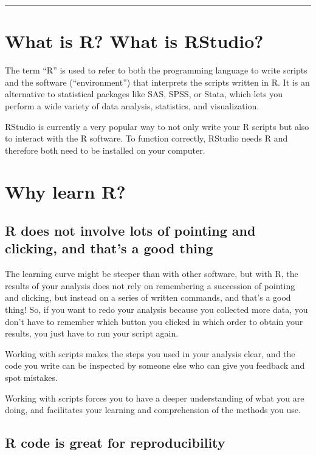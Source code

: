\documentclass[
]{book}
\begin{document}
\begin{center}\rule{0.5\linewidth}{0.5pt}\end{center}

\section{What is R? What is RStudio?}\label{what-is-r-what-is-rstudio}

The term ``R'' is used to refer to both the programming language to write scripts and the software (``environment'') that interprets the scripts written in R. It is an alternative to statistical packages like SAS, SPSS, or Stata, which lets you perform a wide variety of data analysis, statistics, and visualization.

RStudio is currently a very popular way to not only write your R scripts but
also to interact with the R software. To function correctly, RStudio needs R and therefore both need to be installed on your computer.

\section{Why learn R?}\label{why-learn-r}

\subsection{R does not involve lots of pointing and clicking, and that's a good thing}\label{r-does-not-involve-lots-of-pointing-and-clicking-and-thats-a-good-thing}

The learning curve might be steeper than with other software, but with R, the
results of your analysis does not rely on remembering a succession of pointing
and clicking, but instead on a series of written commands, and that's a good
thing! So, if you want to redo your analysis because you collected more data,
you don't have to remember which button you clicked in which order to obtain
your results, you just have to run your script again.

Working with scripts makes the steps you used in your analysis clear, and the
code you write can be inspected by someone else who can give you feedback and
spot mistakes.

Working with scripts forces you to have a deeper understanding of what you are
doing, and facilitates your learning and comprehension of the methods you use.

\subsection{R code is great for reproducibility}\label{r-code-is-great-for-reproducibility}
\end{document}
